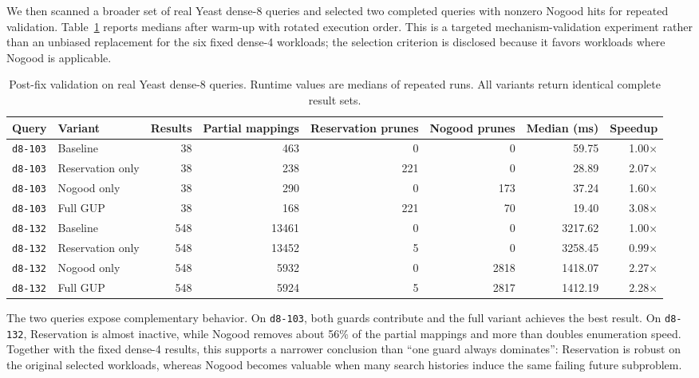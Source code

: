 We then scanned a broader set of real Yeast dense-8 queries and selected two completed queries with nonzero Nogood hits for repeated validation. Table~\ref{tab:nogood-postfix} reports medians after warm-up with rotated execution order. This is a targeted mechanism-validation experiment rather than an unbiased replacement for the six fixed dense-4 workloads; the selection criterion is disclosed because it favors workloads where Nogood is applicable.

\begin{table}[t]
  \caption{Post-fix validation on real Yeast dense-8 queries. Runtime values are medians of repeated runs. All variants return identical complete result sets.}
  \label{tab:nogood-postfix}
  \centering
  \small
  \begin{tabular}{llrrrrrr}
    \toprule
    Query & Variant & Results & Partial mappings & Reservation prunes & Nogood prunes & Median (ms) & Speedup \\
    \midrule
    \texttt{d8-103} & Baseline & 38 & 463 & 0 & 0 & 59.75 & 1.00$\times$ \\
    \texttt{d8-103} & Reservation only & 38 & 238 & 221 & 0 & 28.89 & 2.07$\times$ \\
    \texttt{d8-103} & Nogood only & 38 & 290 & 0 & 173 & 37.24 & 1.60$\times$ \\
    \texttt{d8-103} & Full GUP & 38 & 168 & 221 & 70 & 19.40 & 3.08$\times$ \\
    \midrule
    \texttt{d8-132} & Baseline & 548 & 13461 & 0 & 0 & 3217.62 & 1.00$\times$ \\
    \texttt{d8-132} & Reservation only & 548 & 13452 & 5 & 0 & 3258.45 & 0.99$\times$ \\
    \texttt{d8-132} & Nogood only & 548 & 5932 & 0 & 2818 & 1418.07 & 2.27$\times$ \\
    \texttt{d8-132} & Full GUP & 548 & 5924 & 5 & 2817 & 1412.19 & 2.28$\times$ \\
    \bottomrule
  \end{tabular}
\end{table}

The two queries expose complementary behavior. On \texttt{d8-103}, both guards contribute and the full variant achieves the best result. On \texttt{d8-132}, Reservation is almost inactive, while Nogood removes about 56\% of the partial mappings and more than doubles enumeration speed. Together with the fixed dense-4 results, this supports a narrower conclusion than ``one guard always dominates'': Reservation is robust on the original selected workloads, whereas Nogood becomes valuable when many search histories induce the same failing future subproblem.
